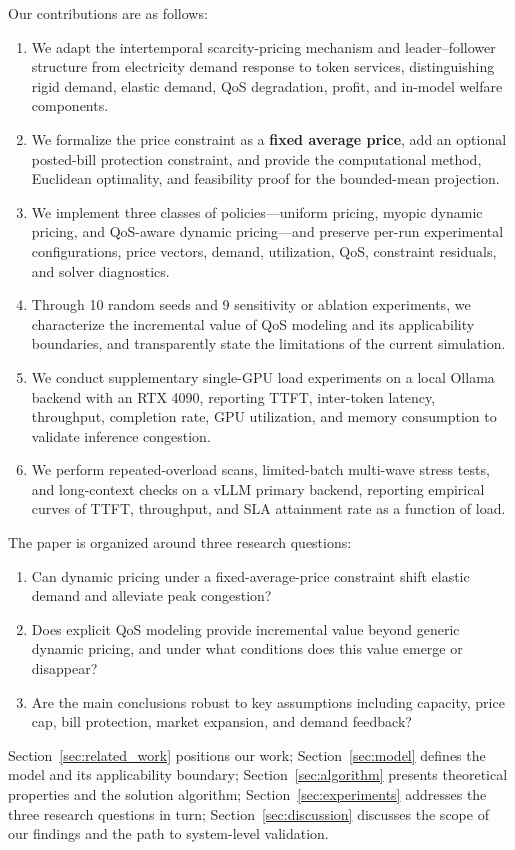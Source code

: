 \documentclass[11pt]{article}
\begin{document}
Our contributions are as follows:
\begin{enumerate}[leftmargin=2em]
  \item We adapt the intertemporal scarcity-pricing mechanism and
  leader--follower structure from electricity demand response to token
  services, distinguishing rigid demand, elastic demand, QoS degradation,
  profit, and in-model welfare components.
  \item We formalize the price constraint as a \textbf{fixed average price},
  add an optional posted-bill protection constraint, and provide the
  computational method, Euclidean optimality, and feasibility proof for the
  bounded-mean projection.
  \item We implement three classes of policies---uniform pricing, myopic
  dynamic pricing, and QoS-aware dynamic pricing---and preserve per-run
  experimental configurations, price vectors, demand, utilization, QoS,
  constraint residuals, and solver diagnostics.
  \item Through 10 random seeds and 9 sensitivity or ablation experiments,
  we characterize the incremental value of QoS modeling and its applicability
  boundaries, and transparently state the limitations of the current
  simulation.
  \item We conduct supplementary single-GPU load experiments on a local
  Ollama backend with an RTX 4090, reporting TTFT, inter-token latency,
  throughput, completion rate, GPU utilization, and memory consumption to
  validate inference congestion.
  \item We perform repeated-overload scans, limited-batch multi-wave stress
  tests, and long-context checks on a vLLM primary backend, reporting
  empirical curves of TTFT, throughput, and SLA attainment rate as a
  function of load.
\end{enumerate}

The paper is organized around three research questions:
\begin{enumerate}[leftmargin=2em,label=\textbf{RQ\arabic*:}]
  \item Can dynamic pricing under a fixed-average-price constraint shift
  elastic demand and alleviate peak congestion?
  \item Does explicit QoS modeling provide incremental value beyond generic
  dynamic pricing, and under what conditions does this value emerge or
  disappear?
  \item Are the main conclusions robust to key assumptions including
  capacity, price cap, bill protection, market expansion, and demand
  feedback?
\end{enumerate}
Section~\ref{sec:related_work} positions our work; Section~\ref{sec:model}
defines the model and its applicability boundary;
Section~\ref{sec:algorithm} presents theoretical properties and the solution
algorithm; Section~\ref{sec:experiments} addresses the three research
questions in turn; Section~\ref{sec:discussion} discusses the scope of our
findings and the path to system-level validation.
\end{document}
